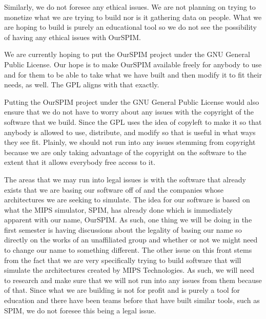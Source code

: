 \documentclass[parskip=half, fontsize=12pt]{scrartcl}
\begin{document}
Similarly, we do not foresee any ethical issues. We are not planning on trying to monetize what we are trying to build nor is it gathering data on people. What we are hoping to build is purely an educational tool so we do not see the possibility of having any ethical issues with OurSPIM.

We are currently hoping to put the OurSPIM project under the GNU General Public License. Our hope is to make OurSPIM available freely for anybody to use and for them to be able to take what we have built and then modify it to fit their needs, as well. The GPL aligns with that exactly. 

Putting the OurSPIM project under the GNU General Public License would also ensure that we do not have to worry about any issues with the copyright of the software that we build. Since the GPL uses the idea of copyleft to make it so that anybody is allowed to use, distribute, and modify so that is useful in what ways they see fit. Plainly, we should not run into any issues stemming from copyright because we are only taking advantage of the copyright on the software to the extent that it allows everybody free access to it.

The areas that we may run into legal issues is with the software that already exists that we are basing our software off of and the companies whose architectures we are seeking to simulate. The idea for our software is based on what the MIPS simulator, SPIM, has already done which is immediately apparent with our name, OurSPIM. As such, one thing we will be doing in the first semester is having discussions about the legality of basing our name so directly on the works of an unaffiliated group and whether or not we might need to change our name to something different. The other issue on this front stems from the fact that we are very specifically trying to build software that will simulate the architectures created by MIPS Technologies. As such, we will need to research and make sure that we will not run into any issues from them because of that. Since what we are building is not for profit and is purely a tool for education and there have been teams before that have built similar tools, such as SPIM, we do not foresee this being a legal issue.
\end{document}
